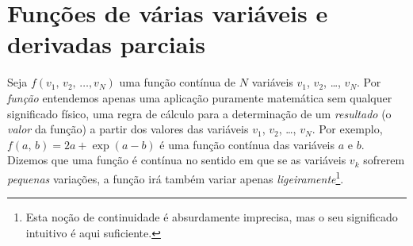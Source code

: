 \section{Funções de várias variáveis e derivadas parciais}
Seja $f(v_1,\,v_2,\,\ldots,v_N)$ uma função contínua de $N$ variáveis $v_1$,
$v_2$, \ldots, $v_N$. Por \emph{função} entendemos apenas uma aplicação
puramente matemática sem qualquer significado físico, uma regra de cálculo
para a determinação de um \emph{resultado} (o \emph{valor} da função) a partir
dos valores das variáveis $v_1$, $v_2$, \ldots, $v_N$. Por exemplo, 
$f(a,\,b)=2a+\exp(a-b)$ é uma função contínua das variáveis $a$ e $b$. Dizemos
que uma função é contínua no sentido em que se as variáveis $v_k$ sofrerem
\emph{pequenas} variações, a função irá também variar apenas
\emph{ligeiramente}\footnote{Esta noção de continuidade é absurdamente
imprecisa, mas o seu significado intuitivo é aqui suficiente.}.

